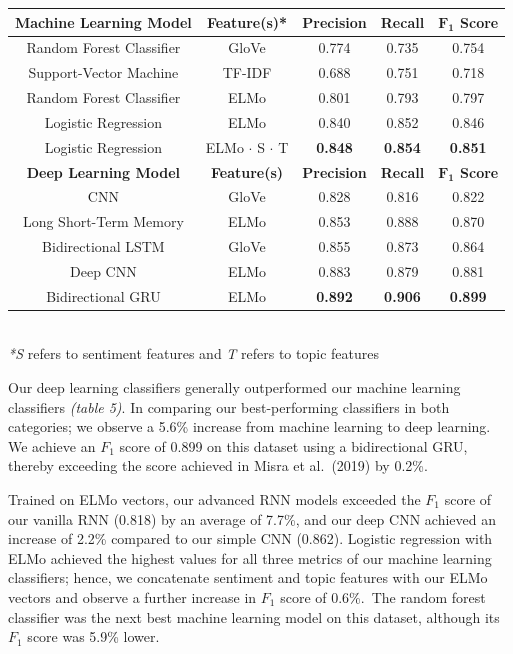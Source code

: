 \documentclass[12pt,a4paper]{article}
\begin{document}
\begin{center}
	\begin{tabular}{c||c|c|c|c}
		\hline
		\textbf{Machine Learning Model}& \textbf{Feature(s)*} & \textbf{Precision} & \textbf{Recall} & \textbf{$\mathbf{F_1}$ Score}\\
		\hline\hline
		Random Forest Classifier & GloVe  & 0.774   & 0.735 & 0.754\\
		Support-Vector Machine & TF-IDF  & 0.688   & 0.751 & 0.718\\
		Random Forest Classifier & ELMo  & 0.801   & 0.793 & 0.797\\
		Logistic Regression & ELMo  & 0.840   & 0.852 & 0.846\\
		Logistic Regression & ELMo $\cdot$ S $\cdot$ T & \textbf{0.848}   & \textbf{0.854} & \textbf{0.851}\\
		\hline\hline
		\textbf{Deep Learning Model}& \textbf{Feature(s)} & \textbf{Precision} & \textbf{Recall} & \textbf{$\mathbf{F_1}$ Score}\\
		\hline
		CNN & GloVe  & 0.828 & 0.816 & 0.822\\
		Long Short-Term Memory & ELMo  & 0.853   & 0.888 & 0.870\\
		Bidirectional LSTM & GloVe  & 0.855   & 0.873 & 0.864\\
		Deep CNN & ELMo & 0.883   & 0.879 & 0.881\\
		Bidirectional GRU & ELMo  & \textbf{0.892}   & \textbf{0.906} & \textbf{0.899}\\
		\hline
	\end{tabular}\\\vspace{5pt}
	\textit{*S} refers to sentiment features and \textit{T} refers to topic features\\\vspace{-8pt}
\end{center}

\noindent Our deep learning classifiers generally outperformed our machine learning classifiers \textit{(table 5)}. In comparing our best-performing classifiers in both categories; we observe a 5.6\% increase from machine learning to deep learning. We achieve an $F_1$ score of 0.899 on this dataset using a bidirectional GRU, thereby exceeding the score achieved in Misra et al.\ (2019) by \cite{misra2019sarcasm} 0.2\%.

Trained on ELMo vectors, our advanced RNN models exceeded the $F_1$ score of our vanilla RNN (0.818) by an average of 7.7\%, and our deep CNN achieved an increase of 2.2\% compared to our simple CNN (0.862). Logistic regression with ELMo achieved the highest values for all three metrics of our machine learning classifiers; hence, we concatenate sentiment and topic features with our ELMo vectors and observe a further increase in $F_1$ score of 0.6\%.\ The random forest classifier was the next best machine learning model on this dataset, although its $F_1$ score was 5.9\% lower.\vspace{-5pt}
\end{document}
